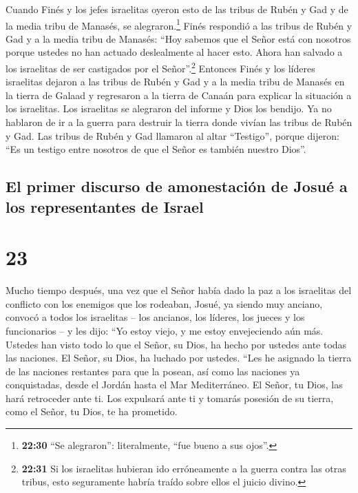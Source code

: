  Cuando Finés y los jefes israelitas oyeron esto de las
tribus de Rubén y Gad y de la media tribu de Manasés, se
alegraron.\footnote{\textbf{22:30} ``Se alegraron'': literalmente, ``fue
  bueno a sus ojos''.}  Finés respondió a las tribus de
Rubén y Gad y a la media tribu de Manasés: ``Hoy sabemos que el Señor
está con nosotros porque ustedes no han actuado deslealmente al hacer
esto. Ahora han salvado a los israelitas de ser castigados por el
Señor''.\footnote{\textbf{22:31} Si los israelitas hubieran ido
  erróneamente a la guerra contra las otras tribus, esto seguramente
  habría traído sobre ellos el juicio divino.}  Entonces
Finés y los líderes israelitas dejaron a las tribus de Rubén y Gad y a
la media tribu de Manasés en la tierra de Galaad y regresaron a la
tierra de Canaán para explicar la situación a los israelitas.
 Los israelitas se alegraron del informe y Dios los
bendijo. Ya no hablaron de ir a la guerra para destruir la tierra donde
vivían las tribus de Rubén y Gad.  Las tribus de Rubén y
Gad llamaron al altar ``Testigo'', porque dijeron: ``Es un testigo entre
nosotros de que el Señor es también nuestro Dios''.

\hypertarget{el-primer-discurso-de-amonestaciuxf3n-de-josuuxe9-a-los-representantes-de-israel}{%
\subsection{El primer discurso de amonestación de Josué a los
representantes de
Israel}\label{el-primer-discurso-de-amonestaciuxf3n-de-josuuxe9-a-los-representantes-de-israel}}

\hypertarget{section-22}{%
\section{23}\label{section-22}}

 Mucho tiempo después, una vez que el Señor había dado la
paz a los israelitas del conflicto con los enemigos que los rodeaban,
Josué, ya siendo muy anciano,  convocó a todos los
israelitas -- los ancianos, los líderes, los jueces y los funcionarios
-- y les dijo: ``Yo estoy viejo, y me estoy envejeciendo aún más.
 Ustedes han visto todo lo que el Señor, su Dios, ha hecho
por ustedes ante todas las naciones. El Señor, su Dios, ha luchado por
ustedes.  ``Les he asignado la tierra de las naciones
restantes para que la posean, así como las naciones ya conquistadas,
desde el Jordán hasta el Mar Mediterráneo.  El Señor, tu
Dios, las hará retroceder ante ti. Los expulsará ante ti y tomarás
posesión de su tierra, como el Señor, tu Dios, te ha prometido.

